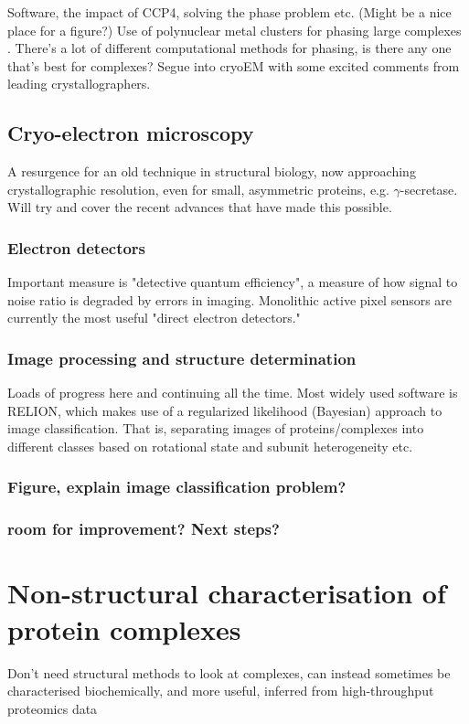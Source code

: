 \documentclass[a4paper,11pt,twoside,openright]{scrbook}
\let\cite\supercite
\begin{document}
Software, the impact of CCP4, solving the phase problem etc. (Might be a nice place for a figure?) Use of polynuclear metal clusters for phasing large complexes \cite{Dauter2005}. There's a lot of different computational methods for phasing, is there any one that's best for complexes? Segue into cryoEM with some excited comments from leading crystallographers.

\subsection{Cryo-electron microscopy}
A resurgence for an old technique in structural biology, now approaching crystallographic resolution, even for small, asymmetric proteins, e.g. \(\gamma\)-secretase. Will try and cover the recent advances that have made this possible.
\subsubsection{Electron detectors}
Important measure is "detective quantum efficiency", a measure of how signal to noise ratio is degraded by errors in imaging. Monolithic active pixel sensors are currently the most useful "direct electron detectors."
\subsubsection{Image processing and structure determination}
Loads of progress here and continuing all the time. Most widely used software is RELION, which makes use of a regularized likelihood (Bayesian) approach to image classification. That is, separating images of proteins/complexes into different classes based on rotational state and subunit heterogeneity etc.
\subsubsection{Figure, explain image classification problem?}
\subsubsection{room for improvement? Next steps?}


\section{Non-structural characterisation of protein complexes}
Don't need structural methods to look at complexes, can instead sometimes be characterised biochemically, and more useful, inferred from high-throughput proteomics data
\end{document}
